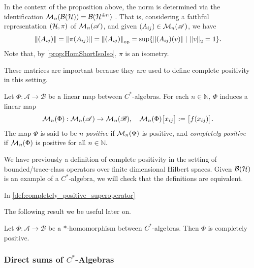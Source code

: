 In the context of the proposition above, the norm is determined via the identification $\mathcal{M}_n(\mathcal{B}(\mathcal{H})) =\mathcal{B}(\mathcal{H}^{\oplus n})$
\cite[Exercises~1.1 and~1.2]{paulsenCompletelyBoundedMaps2003}. That is, considering a faithful representation \((\mathcal{H}, \pi)\) of \(\mathcal{M}_{n}(\mathscr{A})\), and given \((A_{ij}) \in \mathcal{M}_{n}(\mathscr{A})\), we have
\[
\left\lVert (A_{ij}) \right\rVert = \left\lVert \pi(A_{ij}) \right\rVert = \left\lVert (A_{ij}) \right\rVert_{\text{op}} = \sup\{ \left\lVert (A_{ij})(v) \right\rVert \mid \left\lVert v \right\rVert_{2} = 1 \}.
\]
Note that, by \autoref{prop:HomShortIsoIso}, \(\pi\) is an isometry.

These matrices are important because they are used to define complete positivity in this setting.

\begin{definition}
  Let \( \Phi : \mathscr{A} \to \mathscr{B} \) be a linear map between \( C^* \)-algebras. For each \( n \in \mathbb{N} \), \( \Phi \) induces a linear map
\[
\mathcal{M}_{n}(\Phi) :\mathcal{M}_{n}(\mathscr{A}) \to \mathcal{M}_{n}(\mathscr{B}), \quad \mathcal{M}_{n}(\Phi)\big[ x_{ij} \big] := \big[ f(x_{ij}) \big].
\]
The map \( \Phi \) is said to be \emph{\( n \)-positive} if \(\mathcal{M}_{n}(\Phi) \) is positive, and \emph{completely positive} if \( \mathcal{M}_{n}(\Phi) \) is positive for all \( n \in \mathbb{N} \).
\end{definition}

We have previously a definition of complete positivity in the setting of bounded/trace-class operators over finite dimensional Hilbert spaces. Given $\mathcal{B}(\mathcal{H})$ is an example of a $C^*$-algebra, we will check that the definitions are equivalent.

In \autoref{def:completely_positive_superoperator}


The following result we be useful later on.

\begin{proposition} [Proposition 2.3] \cite{choSemanticsQuantumProgramming2016} \label{prop:miu_cp}
  Let $\Phi : \mathscr{A} \to \mathscr{B}$ be a $\ast$-homomorphism between $C^{\ast}$-algebras. Then $\Phi$ is completely positive.
\end{proposition}

\subsubsection{Direct sums of $C^*$-Algebras}

